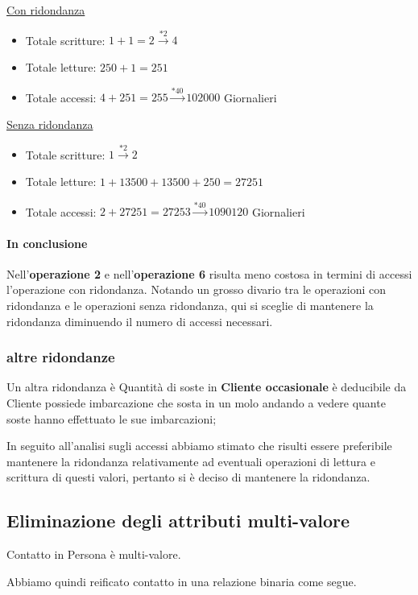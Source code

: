 \underline{Con ridondanza}
\begin{itemize}
    \item Totale scritture: $1 + 1 = 2 \xrightarrow{*2} 4$ 
    \item Totale letture: $250 + 1 = 251$
    \item Totale accessi: $4+251 = 255 \xrightarrow{*40} 102000$ Giornalieri
\end{itemize}
\underline{Senza ridondanza}
\begin{itemize}
    \item Totale scritture: $1 \xrightarrow{*2} 2$ 
    \item Totale letture: $1 + 13500 + 13500 + 250 = 27251$
    \item Totale accessi: $2+27251 = 27253 \xrightarrow{*40} 1090120$ Giornalieri
\end{itemize}

\paragraph{In conclusione}
Nell'\textbf{operazione 2} e nell'\textbf{operazione 6} risulta meno costosa in termini di accessi l'operazione con ridondanza. Notando un grosso divario tra le operazioni con ridondanza e le operazioni senza ridondanza, qui si sceglie di mantenere la ridondanza diminuendo il numero di accessi necessari.

\subsubsection{altre ridondanze}

Un altra ridondanza è Quantità di soste in \textbf{Cliente occasionale} è deducibile da Cliente possiede imbarcazione che sosta in un molo andando a vedere quante soste hanno effettuato le sue imbarcazioni;

In seguito all'analisi sugli accessi abbiamo stimato che risulti essere preferibile mantenere la ridondanza relativamente ad eventuali operazioni di lettura e scrittura di questi valori, 
pertanto si è deciso di mantenere la ridondanza.


\subsection{Eliminazione degli attributi multi-valore}

Contatto in Persona è multi-valore.

Abbiamo quindi reificato contatto in una relazione binaria come segue.

